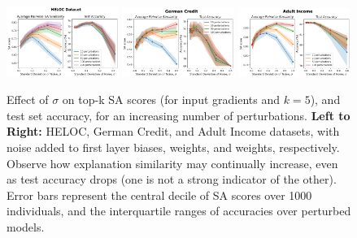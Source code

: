 \begin{figure}[t]
    \centering
    \includegraphics[width=0.325\textwidth]{figures/perturb_heloc_samples.png}
    \includegraphics[width=0.325\textwidth]{figures/perturb_german_samples.png}
    \includegraphics[width=0.325\textwidth]{figures/perturb_adult_samples.png}
    \caption{\small Effect of $\sigma$ on top-k SA scores (for input gradients and $k=5$), and test set accuracy, for an increasing number of perturbations. \textbf{Left to Right:} HELOC, German Credit, and Adult Income datasets, with noise added to first layer biases,  weights, and weights, respectively. Observe how explanation similarity may continually increase, even as test accuracy drops (one is not a strong indicator of the other). Error bars represent the central decile of SA scores over 1000 individuals, and the interquartile ranges of accuracies over perturbed models.}
    \label{fig:perturb_ablation}
\end{figure}

